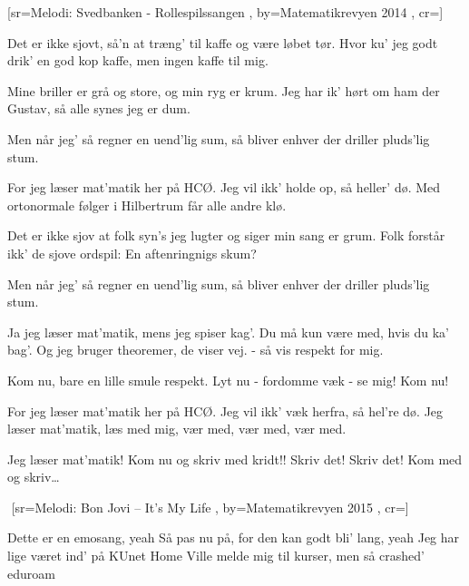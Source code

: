 \documentclass[pdftex,12pt]{article}
\begin{document}
\begin{songs}{}
\endverse
\endsong

\newpage


﻿[sr={Melodi: Svedbanken - Rollespilssangen}
,
by={Matematikrevyen 2014}
,
cr={}]\hypertarget{Matematiksangen}{}
\label{song13}

\beginverse
Det er ikke sjovt, så’n at træng’ til kaffe
og være løbet tør.
Hvor ku' jeg godt drik' en god kop kaffe,
men ingen kaffe til mig.
\endverse

\beginverse
Mine briller er grå og store,
og min ryg er krum.
Jeg har ik’ hørt om ham der Gustav,
så alle synes jeg er dum.
\endverse

\beginverse
Men når jeg’ så regner en uend'lig sum,
så bliver enhver der driller pluds'lig stum.
\endverse

\beginverse
For jeg læser mat’matik her på HCØ.
Jeg vil ikk’ holde op, så heller' dø.
Med ortonormale følger i Hilbertrum
får alle andre klø.
\endverse

\beginverse
Det er ikke sjov at folk syn’s jeg lugter
og siger min sang er grum.
Folk forstår ikk’ de sjove ordspil:
En aftenringnigs skum?
\endverse

\beginverse
Men når jeg’ så regner en uend'lig sum,
så bliver enhver der driller pluds'lig stum.
\endverse

\beginverse
Ja jeg læser mat’matik, mens jeg spiser kag’.
Du må kun være med, hvis du ka’ bag’.
Og jeg bruger theoremer, de viser vej.
 - så vis respekt for mig.
\endverse

\beginverse
Kom nu, bare en lille smule respekt.
Lyt nu - fordomme væk - se mig!
Kom nu!
\endverse

\beginverse
For jeg læser mat’matik her på HCØ.
Jeg vil ikk’ væk herfra, så hel’re dø.
Jeg læser mat’matik,
læs med mig, vær med, vær med, vær med.
\endverse

\beginverse
Jeg læser mat’matik!
Kom nu og skriv med kridt!! Skriv det! Skriv det! Kom med og skriv\ldots
\endverse
\endsong

\setcounter{temppage}{\value{page}}
\setcounter{page}{\value{temppage}}


﻿
[sr={Melodi: Bon Jovi -- It's My Life}
,
by={Matematikrevyen 2015}
,
cr={}]\hypertarget{Fuck mit liv}{}
\label{song14}

\beginverse
Dette er en emosang, yeah
Så pas nu på, for den kan godt bli' lang, yeah
Jeg har lige været ind' på KUnet Home
Ville melde mig til kurser, men så crashed' eduroam
\endverse


\end{songs}
\end{document}
